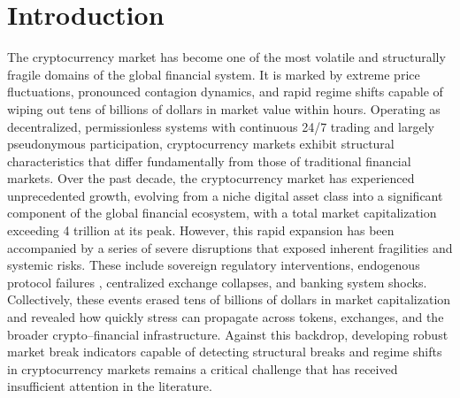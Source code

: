 \documentclass[11pt,reqno]{amsart}
\numberwithin{equation}{section} %
\begin{document}
\section{Introduction}\label{sec1}
The cryptocurrency market has become one of the most volatile and structurally fragile domains of the global financial system\citep{RN3947}. It is marked by extreme price fluctuations, pronounced contagion dynamics, and rapid regime shifts capable of wiping out tens of billions of dollars in market value within hours\citep{RN3946}. 
Operating as decentralized, permissionless systems with continuous 24/7 trading and largely pseudonymous participation, cryptocurrency markets exhibit structural characteristics that differ fundamentally from those of traditional financial markets\cite{hardle2020understanding,giudici2020cryptocurrencies,bunjaku2017cryptocurrencies}.
Over the past decade, the cryptocurrency market has experienced unprecedented growth, evolving from a niche digital asset class into a significant component of the global 
financial ecosystem, with a total market capitalization exceeding 4 trillion at its peak\cite{kaal2020digital,bongini2025crypto,koshelev2022trends}. 
However, this rapid expansion has been accompanied by a series of severe disruptions that exposed inherent fragilities and systemic risks. 
These include sovereign regulatory interventions, endogenous protocol failures \cite{uhlig2022luna}, centralized exchange collapses\cite{conlon2023collapse}, and banking system shocks\citep{RN3948}. 
Collectively, these events erased tens of billions of dollars in market capitalization and revealed how quickly stress can propagate across tokens, exchanges, and the broader crypto–financial infrastructure\cite{lehar2022systemic}. 
Against this backdrop, developing robust market break indicators capable of detecting structural breaks and regime shifts in cryptocurrency markets remains a critical challenge that has received insufficient attention in the literature.
\end{document}
